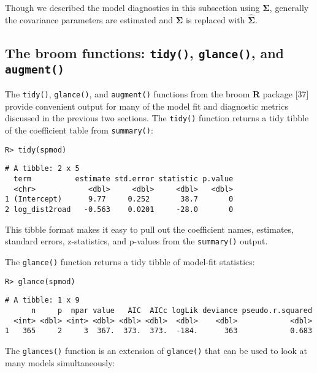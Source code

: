 \documentclass[10pt,letterpaper]{article}
\begin{document}
Though we described the model diagnostics in this subsection using
\(\boldsymbol{\Sigma}\), generally the covariance parameters are
estimated and \(\boldsymbol{\Sigma}\) is replaced with
\(\boldsymbol{\hat{\Sigma}}\).

\hypertarget{the-broom-functions-tidy-glance-and-augment}{%
\subsection{\texorpdfstring{The broom functions: \texttt{tidy()},
\texttt{glance()}, and
\texttt{augment()}}{The broom functions: tidy(), glance(), and augment()}}\label{the-broom-functions-tidy-glance-and-augment}}

The \texttt{tidy()}, \texttt{glance()}, and \texttt{augment()} functions
from the broom \textbf{\textsf{R}} package {[}37{]} provide convenient
output for many of the model fit and diagnostic metrics discussed in the
previous two sections. The \texttt{tidy()} function returns a tidy
tibble of the coefficient table from \texttt{summary()}:

\begin{verbatim}
R> tidy(spmod)
\end{verbatim}

\begin{verbatim}
# A tibble: 2 x 5
  term          estimate std.error statistic p.value
  <chr>            <dbl>     <dbl>     <dbl>   <dbl>
1 (Intercept)      9.77     0.252       38.7       0
2 log_dist2road   -0.563    0.0201     -28.0       0
\end{verbatim}

\noindent This tibble format makes it easy to pull out the coefficient
names, estimates, standard errors, z-statistics, and p-values from the
\texttt{summary()} output.

The \texttt{glance()} function returns a tidy tibble of model-fit
statistics:

\begin{verbatim}
R> glance(spmod)
\end{verbatim}

\begin{verbatim}
# A tibble: 1 x 9
      n     p  npar value   AIC  AICc logLik deviance pseudo.r.squared
  <int> <dbl> <int> <dbl> <dbl> <dbl>  <dbl>    <dbl>            <dbl>
1   365     2     3  367.  373.  373.  -184.      363            0.683
\end{verbatim}

The \texttt{glances()} function is an extension of \texttt{glance()}
that can be used to look at many models simultaneously:
\end{document}
